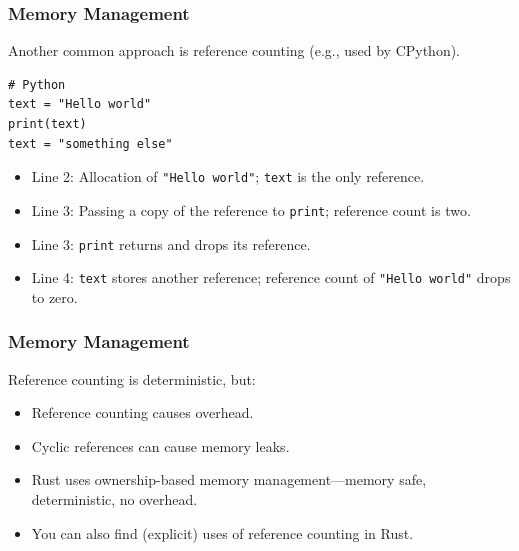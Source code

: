 \begin{frame}[fragile]
    \frametitle{Memory Management}
    Another common approach is reference counting (e.g., used by CPython).
    \pause
    \vfill
    \begin{verbatim}
# Python
text = "Hello world"
print(text)
text = "something else"
    \end{verbatim}
    \pause
    \vfill
    \begin{itemize}
        \item Line 2: Allocation of \texttt{"Hello world"}; \texttt{text} is the only reference.
        \item Line 3: Passing a copy of the reference to \texttt{print}; reference count is two.
        \item Line 3: \texttt{print} returns and drops its reference.
        \item Line 4: \texttt{text} stores another reference; reference count of \texttt{"Hello world"} drops to zero.
    \end{itemize}
\end{frame}

\begin{frame}[fragile]
    \frametitle{Memory Management}
    Reference counting is deterministic, but:
    \pause
    \vfill
    \begin{itemize}
        \item Reference counting causes overhead.
        \item Cyclic references can cause memory leaks.
    \pause
    \vfill
        \item Rust uses ownership-based memory management---memory safe, deterministic, no overhead.
        \item You can also find (explicit) uses of reference counting in Rust.
    \end{itemize}
\end{frame}

